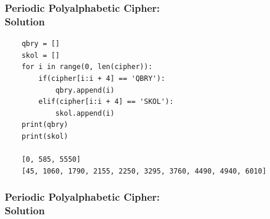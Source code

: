 \documentclass{uva-inf-presentation}
\begin{document}
\begin{frame}[containsverbatim]
\frametitle{Periodic Polyalphabetic Cipher:\\ Solution}
\begin{lstlisting}
    qbry = []
    skol = []
    for i in range(0, len(cipher)):
        if(cipher[i:i + 4] == 'QBRY'):
            qbry.append(i)
        elif(cipher[i:i + 4] == 'SKOL'):
            skol.append(i)
    print(qbry)
    print(skol)

    [0, 585, 5550]
    [45, 1060, 1790, 2155, 2250, 3295, 3760, 4490, 4940, 6010]
\end{lstlisting}
\end{frame}

\begin{frame}[containsverbatim]
\frametitle{Periodic Polyalphabetic Cipher:\\ Solution}


\end{frame}
\end{document}
